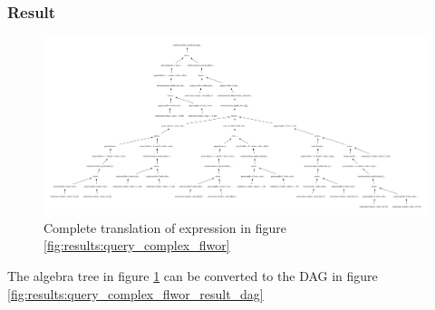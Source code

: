 \subsubsection{Result}
\begin{figure}[!htp]
\begin{center}
  \includegraphics[width=1.0\textwidth]{img/graphs/td_impl_flwor_complex_xq_relalg} \caption{Complete translation of expression in figure
  \ref{fig:results:query_complex_flwor}}
  \label{fig:results:query_complex_flwor_result}
\end{center}
\end{figure}


The algebra tree in figure \ref{fig:results:query_complex_flwor_result} can
be converted to the DAG in figure
\ref{fig:results:query_complex_flwor_result_dag}

